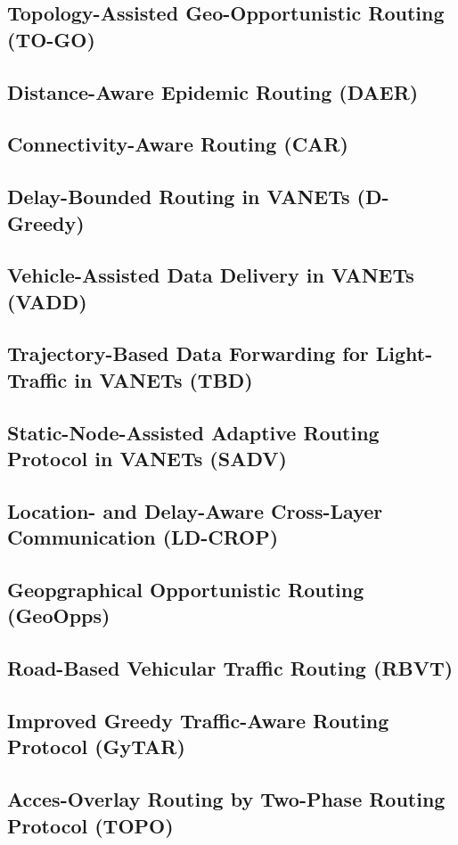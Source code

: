 \documentclass[english,runningheads,a4paper]{llncs}[2018/03/10]
\begin{document}
\subsection{Topology-Assisted Geo-Opportunistic Routing (TO-GO)}

\subsection{Distance-Aware Epidemic Routing (DAER)}
\subsection{Connectivity-Aware Routing (CAR)}

\subsection{Delay-Bounded Routing in VANETs (D-Greedy)}
\subsection{Vehicle-Assisted Data Delivery in VANETs (VADD)}
\subsection{Trajectory-Based Data Forwarding for Light-Traffic in VANETs (TBD)}
\subsection{Static-Node-Assisted Adaptive Routing Protocol in VANETs (SADV)}
\subsection{Location- and Delay-Aware Cross-Layer Communication (LD-CROP)}
\subsection{Geopgraphical Opportunistic Routing (GeoOpps)}
\subsection{Road-Based Vehicular Traffic Routing (RBVT)}
\subsection{Improved Greedy Traffic-Aware Routing Protocol (GyTAR)}
\subsection{Acces-Overlay Routing by Two-Phase Routing Protocol (TOPO)}
\end{document}
